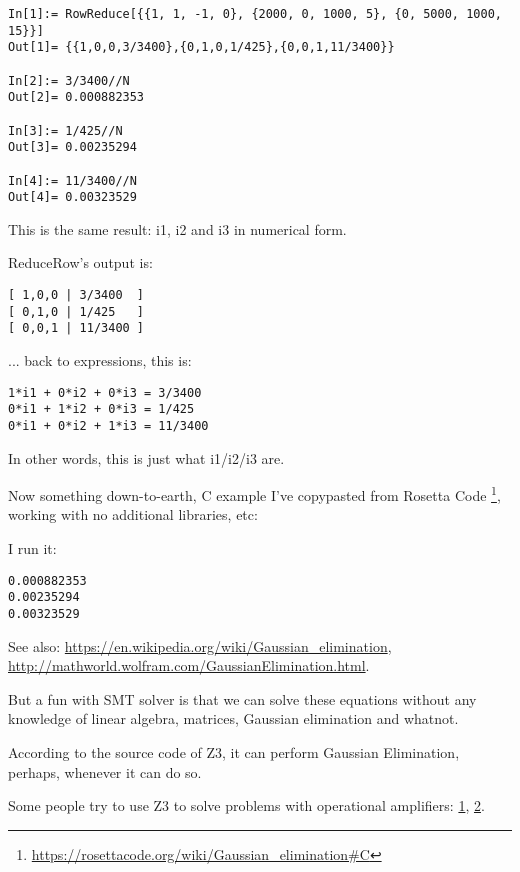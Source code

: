\begin{lstlisting}
In[1]:= RowReduce[{{1, 1, -1, 0}, {2000, 0, 1000, 5}, {0, 5000, 1000, 15}}]
Out[1]= {{1,0,0,3/3400},{0,1,0,1/425},{0,0,1,11/3400}}

In[2]:= 3/3400//N
Out[2]= 0.000882353

In[3]:= 1/425//N
Out[3]= 0.00235294

In[4]:= 11/3400//N
Out[4]= 0.00323529
\end{lstlisting}

This is the same result: i1, i2 and i3 in numerical form.

ReduceRow's output is:

\begin{lstlisting}
[ 1,0,0 | 3/3400  ]
[ 0,1,0 | 1/425   ]
[ 0,0,1 | 11/3400 ]
\end{lstlisting}

... back to expressions, this is:

\begin{lstlisting}
1*i1 + 0*i2 + 0*i3 = 3/3400
0*i1 + 1*i2 + 0*i3 = 1/425
0*i1 + 0*i2 + 1*i3 = 11/3400
\end{lstlisting}

In other words, this is just what i1/i2/i3 are.

Now something down-to-earth, C example I've copypasted from 
Rosetta Code
\footnote{\url{https://rosettacode.org/wiki/Gaussian_elimination\#C}},
working with no additional libraries, etc:



I run it:

\begin{lstlisting}
0.000882353
0.00235294
0.00323529
\end{lstlisting}

See also: \url{https://en.wikipedia.org/wiki/Gaussian_elimination}, \\
\url{http://mathworld.wolfram.com/GaussianElimination.html}.

But a fun with SMT solver is that we can solve these equations without any knowledge of linear algebra, matrices,
Gaussian elimination and whatnot.

According to the source code of Z3, it can perform Gaussian Elimination, perhaps, whenever it can do so.

Some people try to use Z3 to solve problems with operational amplifiers:
\href{https://stackoverflow.com/questions/16552770/how-to-use-z3py-online-to-solve-problems-with-operational-amplifiers}{1},
\href{https://stackoverflow.com/questions/19317677/how-to-use-z3-smt-lib-online-to-solve-problems-with-operational-amplifiers}{2}.

\levelup{}

